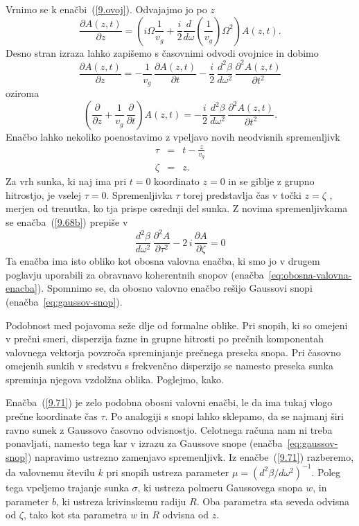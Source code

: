 Vrnimo se k enačbi~(\ref{9.ovoj}). Odvajajmo jo po $z$ 
\begin{equation}
 \frac{\partial A(z,t)}{\partial z} = \left( i\Omega \frac{1}{v_g}+ \frac{i}{2}
\frac{d}{d\omega} \left(\frac{1}{v_g}\right) \Omega^2 \right) A(z,t).
\label{9.67}
\end{equation}
Desno stran izraza lahko zapišemo s časovnimi odvodi ovojnice in dobimo 
\begin{equation}
\frac{\partial A(z,t)}{\partial z} = -\frac{1}{v_{g}}\,\frac{\partial A (z,t)}{\partial t}
-\frac{i}{2}\,\frac{d^{2}\beta}{d\omega^{2}}\,\frac{\partial^{2}A\left(z,t\right)}{\partial t^{2}}
\label{9.68} 
\end{equation}
oziroma
\begin{equation}
\left(\frac{\partial}{\partial z} + \frac{1}{v_{g}}\,\frac{\partial }{\partial t}\right)A (z,t) = 
-\frac{i}{2}\,\frac{d^{2}\beta}{d\omega^{2}}\,\frac{\partial^{2}A\left(z,t\right)}{\partial t^{2}}.
\label{9.68b} 
\end{equation}
Enačbo lahko nekoliko poenostavimo z vpeljavo novih neodvisnih spremenljivk
\begin{eqnarray}
\tau & = & t-\frac{z}{v_{g}}\nonumber \\
\zeta & = & z.
\label{9.70}
\end{eqnarray}
Za vrh sunka, ki naj ima pri $t=0$ koordinato $z=0$ in se giblje
z grupno hitrostjo, je vselej $\tau=0$. Spremenljivka $\tau$ torej predstavlja
čas v točki $z=\zeta$ , merjen od trenutka, ko tja
prispe osrednji del sunka. Z novima spremenljivkama se enačba~(\ref{9.68b})
prepiše v 
\begin{equation}
\frac{d^{2}\beta}{d\omega^{2}}\,\frac{\partial^{2}A}{\partial\tau^{2}}-
2\, i\,\frac{\partial A}{\partial\zeta}=0
\label{9.71}
\end{equation}
Ta enačba ima isto obliko kot obosna valovna enačba, ki smo jo v
drugem poglavju uporabili za obravnavo koherentnih 
snopov (enačba~\ref{eq:obosna-valovna-enacba}). Spomnimo se, da 
obosno valovno enačbo rešijo Gaussovi snopi (enačba~\ref{eq:gaussov-snop}). 

Podobnost med pojavoma seže dlje od formalne oblike. Pri snopih, ki so omejeni 
v prečni smeri, disperzija fazne in grupne hitrosti po prečnih komponentah valovnega
vektorja povzroča spreminjanje prečnega preseka snopa. Pri časovno
omejenih sunkih v sredstvu s frekvenčno disperzijo se namesto preseka sunka
spreminja njegova vzdolžna oblika. Poglejmo, kako.

Enačba~(\ref{9.71}) je zelo podobna obosni valovni enačbi, le da ima tukaj vlogo 
prečne koordinate čas $\tau$. Po analogiji s snopi lahko sklepamo, da se najmanj 
širi ravno sunek z Gaussovo časovno odvisnostjo. Celotnega računa
nam ni treba ponavljati, namesto tega kar v izrazu za Gaussove snope 
(enačba~\ref{eq:gaussov-snop}) napravimo ustrezno zamenjavo spremenljivk. 
Iz enačbe~(\ref{9.71}) razberemo, da valovnemu številu $k$ pri snopih  
ustreza parameter $\mu=(d^{2}\beta/d\omega^{2})^{-1}$. Poleg tega vpeljemo
trajanje sunka $\sigma$, ki ustreza polmeru Gaussovega snopa $w$, in parameter
$b$, ki ustreza krivinskemu radiju $R$. Oba parametra sta seveda odvisna od $\zeta$, 
tako kot sta parametra $w$ in $R$ odvisna od $z$. 

